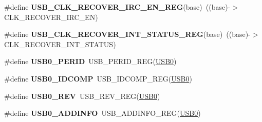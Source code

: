 \begin{DoxyCompactItemize}
\item 
\#define {\bfseries U\+S\+B\+\_\+\+C\+L\+K\+\_\+\+R\+E\+C\+O\+V\+E\+R\+\_\+\+I\+R\+C\+\_\+\+E\+N\+\_\+\+R\+EG}(base)~((base)-\/$>$C\+L\+K\+\_\+\+R\+E\+C\+O\+V\+E\+R\+\_\+\+I\+R\+C\+\_\+\+EN)\hypertarget{group__USB__Register__Accessor__Macros_ga62c6e9b44d5c310af67ba161cc611c78}{}\label{group__USB__Register__Accessor__Macros_ga62c6e9b44d5c310af67ba161cc611c78}

\item 
\#define {\bfseries U\+S\+B\+\_\+\+C\+L\+K\+\_\+\+R\+E\+C\+O\+V\+E\+R\+\_\+\+I\+N\+T\+\_\+\+S\+T\+A\+T\+U\+S\+\_\+\+R\+EG}(base)~((base)-\/$>$C\+L\+K\+\_\+\+R\+E\+C\+O\+V\+E\+R\+\_\+\+I\+N\+T\+\_\+\+S\+T\+A\+T\+US)\hypertarget{group__USB__Register__Accessor__Macros_ga506a69a5f174f580fe5db1906217d5af}{}\label{group__USB__Register__Accessor__Macros_ga506a69a5f174f580fe5db1906217d5af}

\item 
\#define {\bfseries U\+S\+B0\+\_\+\+P\+E\+R\+ID}~U\+S\+B\+\_\+\+P\+E\+R\+I\+D\+\_\+\+R\+EG(\hyperlink{group__USB__Peripheral__Access__Layer_gaea56c015ce8ad0cc88464060fde6d87c}{U\+S\+B0})\hypertarget{group__USB__Register__Accessor__Macros_gabee4af6581d4520bd5d8d823d8668889}{}\label{group__USB__Register__Accessor__Macros_gabee4af6581d4520bd5d8d823d8668889}

\item 
\#define {\bfseries U\+S\+B0\+\_\+\+I\+D\+C\+O\+MP}~U\+S\+B\+\_\+\+I\+D\+C\+O\+M\+P\+\_\+\+R\+EG(\hyperlink{group__USB__Peripheral__Access__Layer_gaea56c015ce8ad0cc88464060fde6d87c}{U\+S\+B0})\hypertarget{group__USB__Register__Accessor__Macros_gac5372cae1990fc1ac7c4e92cf5f02e62}{}\label{group__USB__Register__Accessor__Macros_gac5372cae1990fc1ac7c4e92cf5f02e62}

\item 
\#define {\bfseries U\+S\+B0\+\_\+\+R\+EV}~U\+S\+B\+\_\+\+R\+E\+V\+\_\+\+R\+EG(\hyperlink{group__USB__Peripheral__Access__Layer_gaea56c015ce8ad0cc88464060fde6d87c}{U\+S\+B0})\hypertarget{group__USB__Register__Accessor__Macros_ga15f94e84d4edea37a5105310c316c303}{}\label{group__USB__Register__Accessor__Macros_ga15f94e84d4edea37a5105310c316c303}

\item 
\#define {\bfseries U\+S\+B0\+\_\+\+A\+D\+D\+I\+N\+FO}~U\+S\+B\+\_\+\+A\+D\+D\+I\+N\+F\+O\+\_\+\+R\+EG(\hyperlink{group__USB__Peripheral__Access__Layer_gaea56c015ce8ad0cc88464060fde6d87c}{U\+S\+B0})\hypertarget{group__USB__Register__Accessor__Macros_gaff725c65f6ef8cabfafd851c6d1cb41f}{}\label{group__USB__Register__Accessor__Macros_gaff725c65f6ef8cabfafd851c6d1cb41f}


\end{DoxyCompactItemize}
